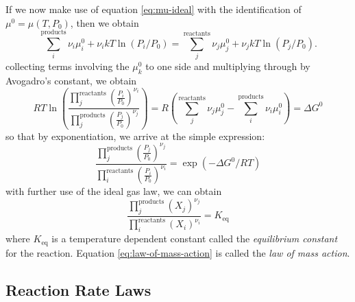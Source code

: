 If we now make use of equation \ref{eq:mu-ideal} with the identification of $\mu^0 = \mu(T,P_0)$, then we obtain
\begin{equation}
  \sum_{i}^{\text{products}}\nu_i\mu_i^0 + \nu_i kT\ln(P_i/P_0) = \sum_{j}^{\text{reactants}} \nu_j\mu_j^0 + \nu_j kT\ln(P_j/P_0).
\end{equation}
collecting terms involving the $\mu^0_k$ to one side and multiplying through by Avogadro's constant, we obtain
\begin{equation}
  RT\ln\left(\frac{\prod\limits_j^{\text{reactants}}\left(\frac{P_i}{P_0}\right)^{\nu_i}}{\prod\limits_j^{\text{products}}\left(\frac{P_j}{P_0}\right)^{\nu_j}}\right) = R\left(\sum_j^{\text{reactants}}\nu_j\mu_j^0 -  \sum_i^{\text{products}} \nu_i\mu_i^0\right) = \Delta G^0
\end{equation}
so that by exponentiation, we arrive at the simple expression:
\begin{equation}
  \frac{\prod\limits_j^{\text{products}}\left(\frac{P_j}{P_0}\right)^{\nu_j}}{\prod\limits_i^{\text{reactants}}\left(\frac{P_i}{P_0}\right)^{\nu_i}} = \exp(-\Delta G^0/RT)
\end{equation}
with further use of the ideal gas law, we can obtain
\begin{equation}
  \label{eq:law-of-mass-action}
  \boxed{\frac{\prod\limits_j^{\text{products}}\left(X_j\right)^{\nu_j}}{\prod\limits_i^{\text{reactants}}\left(X_i\right)^{\nu_i}} = K_{\text{eq}}}
\end{equation}
where $K_{\text{eq}}$ is a temperature dependent constant called the \textit{equilibrium constant} for the reaction. Equation \ref{eq:law-of-mass-action} is called the \textit{law of mass action}.



\subsection{Reaction Rate Laws}


